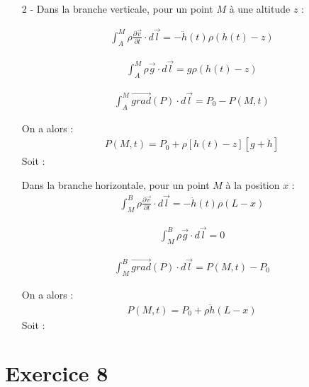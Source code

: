 \documentclass{report}
\begin{document}
\begin{itemize}
\item[2 - ] Dans la branche verticale, pour un point $M$ à une altitude $z$ :

\begin{align*}
	\int_A^M\rho\frac{\partial \vec{v}}{\partial t}\cdot d\vec{l}=-\ddot{h}(t)\rho(h(t)-z)
\end{align*}

\begin{align*}
	\int_A^M\rho\vec{g}\cdot d\vec{l}=g\rho(h(t)-z)
\end{align*}

\begin{align*}
	\int_A^M\vec{grad}(P)\cdot d\vec{l}=P_0-P(M,t)
\end{align*}

On a alors :
\begin{align*}
	P(M,t)=P_0+\rho\left[ h(t)-z \right] \left[g+\ddot{h} \right] 
\end{align*}
Soit :

\noindent{}

Dans la branche horizontale, pour un point $M$ à la position $x$ :
\begin{align*}
	\int_M^B\rho\frac{\partial \vec{v}}{\partial t}\cdot d\vec{l}=-\ddot{h}(t)\rho(L-x)
\end{align*}

\begin{align*}
	\int_M^B\rho\vec{g}\cdot d\vec{l}=0
\end{align*}

\begin{align*}
	\int_M^B\vec{grad}(P)\cdot d\vec{l}=P(M,t)-P_0
\end{align*}

On a alors :
\begin{align*}
	P(M,t)=P_0+\rho\ddot{h}(L-x)
\end{align*}
Soit :

\noindent{}

\end{itemize}

\section*{Exercice 8}
\end{document}
